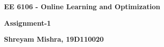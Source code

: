 \documentclass[a4paper,12pt]{article} %
\begin{document}



\thispagestyle{empty} %


\begin{center} %
	{\Large \bf EE 6106 - Online Learning and Optimization}
	\vspace{2mm} %
	
	\bf{Assignment-1} %
	
	\vspace{2mm}
	
	{\bf Shreyam Mishra, 19D110020} %
		
\end{center}  

\vspace*{0.3cm} 


%






\end{document}
